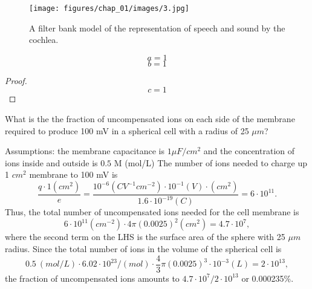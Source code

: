 \begin{figure}[h]
    \center
    \texttt{[image: figures/chap\_01/images/3.jpg]}
    \caption{A filter bank model of the representation of speech and sound by the cochlea.}
    \label{fig:cochleam}
\end{figure}

\begin{theorem}[Name 1]
    \begin{example}[Name 2]
        \[
            a = 1
        \]
        \[
            b = 1
        \]
    \end{example}

    \begin{proof}
        \[
            c = 1
        \]
    \end{proof}
\end{theorem}

%
%

\begin{example}

    \noindent
    What is the the fraction of uncompensated ions on each side of the
    membrane required to produce 100 mV in a spherical cell with
    a radius of 25 $\mu m$?

    Assumptions: the membrane capacitance is $1 \mu F/cm^2$ and the concentration of ions inside and outside is $0.5$ M (mol/L)
    The number of ions needed to charge up 1 $cm^2$ membrane
    to 100 mV is
    \[
    \frac{q \cdot 1 (cm^2)}{e} = \frac{10^{-6}(C V^{-1} cm^{-2}) \cdot
    10^{-1} (V) \cdot (cm^2)}{1.6 \cdot 10^{-19}(C)} = 6 \cdot 10^{11} .
    \]
    Thus, the total number of uncompensated ions needed for the
    cell membrane is
    \[
    6 \cdot 10^{11} (cm^{-2}) \cdot 4 \pi (0.0025)^2 (cm^2) =
    4.7 \cdot 10^7 ,
    \]
    where the second term on the LHS is the surface area of the sphere
    with 25 $\mu m$ radius.
    Since the total number of ions in the volume of the spherical cell is
    \[
    0.5 ~(mol/L) \cdot 6.02 \cdot 10^{23} / (mol)
    \cdot \frac{4}{3} \pi (0.0025)^3 \cdot 10^{-3} (L) = 2\cdot 10^{13},
    \]
    the fraction of uncompensated ions amounts to
    $4.7 \cdot 10^7 / 2 \cdot 10^{13}$ or 0.000235\%.
\end{example}


